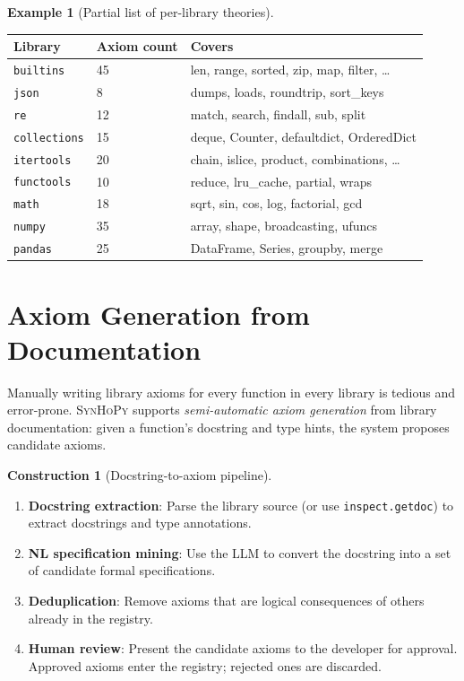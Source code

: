 \documentclass[11pt,a4paper]{report}
\theoremstyle{definition}
\newtheorem{example}[definition]{Example}
\newtheorem{construction}[definition]{Construction}
\theoremstyle{plain}
\newcommand{\synhopy}{\textsc{SynHoPy}}
\begin{document}
\begin{example}[Partial list of per-library theories]
\begin{center}
\begin{tabular}{lll}
\toprule
\textbf{Library} & \textbf{Axiom count} & \textbf{Covers} \\
\midrule
\texttt{builtins} & 45 & len, range, sorted, zip, map, filter, \ldots \\
\texttt{json} & 8 & dumps, loads, roundtrip, sort\_keys \\
\texttt{re} & 12 & match, search, findall, sub, split \\
\texttt{collections} & 15 & deque, Counter, defaultdict, OrderedDict \\
\texttt{itertools} & 20 & chain, islice, product, combinations, \ldots \\
\texttt{functools} & 10 & reduce, lru\_cache, partial, wraps \\
\texttt{math} & 18 & sqrt, sin, cos, log, factorial, gcd \\
\texttt{numpy} & 35 & array, shape, broadcasting, ufuncs \\
\texttt{pandas} & 25 & DataFrame, Series, groupby, merge \\
\bottomrule
\end{tabular}
\end{center}
\end{example}

\section{Axiom Generation from Documentation}

Manually writing library axioms for every function in every library is
tedious and error-prone.  \synhopy{} supports \emph{semi-automatic axiom
generation} from library documentation: given a function's docstring and
type hints, the system proposes candidate axioms.

\begin{construction}[Docstring-to-axiom pipeline]
\begin{enumerate}
  \item \textbf{Docstring extraction}: Parse the library source (or use
    \texttt{inspect.getdoc}) to extract docstrings and type annotations.
  \item \textbf{NL specification mining}: Use the LLM to convert the
    docstring into a set of candidate formal specifications.
  \item \textbf{Deduplication}: Remove axioms that are logical consequences
    of others already in the registry.
  \item \textbf{Human review}: Present the candidate axioms to the developer
    for approval.  Approved axioms enter the registry; rejected ones are
    discarded.
\end{enumerate}
\end{construction}
\end{document}
